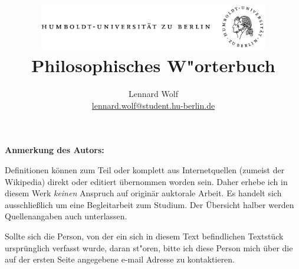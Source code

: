 \documentclass[twoside,twocolumn]{book}
\begin{document}
\title{
   \vspace{-70pt}
	\includegraphics*[width=0.75\textwidth]{images/hu_logo.png}\\
	\vspace{24pt}
	Philosophisches W"orterbuch}
\author{Lennard Wolf\\
        \href{mailto:lennard.wolf@student.hu-berlin.de}{lennard.wolf@student.hu-berlin.de}}
\maketitle

\textbf{Anmerkung des Autors:} 

Definitionen können zum Teil oder komplett aus Internetquellen (zumeist der Wikipedia) direkt oder editiert übernommen worden sein. Daher erhebe ich in diesem Werk \emph{keinen} Anspruch auf originär auktorale Arbeit. Es handelt sich ausschließlich um eine Begleitarbeit zum Studium. Der Übersicht halber werden Quellenangaben auch unterlassen. 

Sollte sich die Person, von der ein sich in diesem Text befindlichen Textstück ursprünglich verfasst wurde, daran st"oren, bitte ich diese Person mich über die auf der ersten Seite angegebene e-mail Adresse zu kontaktieren.
\end{document}
